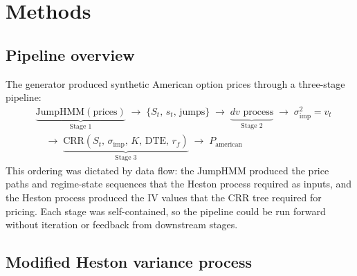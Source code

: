 \section{Methods}\label{sec:methods}

\subsection{Pipeline overview}

The generator produced synthetic American option prices through a three-stage pipeline:
\begin{align}\label{eq:pipeline}
    &\underbrace{\text{JumpHMM}(\text{prices})}_{\text{Stage 1}}
    \;\to\; \{S_t,\, s_t,\, \text{jumps}\}
    \;\to\; \underbrace{dv \text{ process}}_{\text{Stage 2}}
    \;\to\; \sigma_{\text{imp}}^2 = v_t \nonumber\\
    &\quad\to\; \underbrace{\text{CRR}(S_t,\, \sigma_{\text{imp}},\, K,\, \text{DTE},\, r_f)}_{\text{Stage 3}}
    \;\to\; P_{\text{american}}
\end{align}
This ordering was dictated by data flow: the JumpHMM produced the price paths and regime-state sequences that the Heston process required as inputs, and the Heston process produced the IV values that the CRR tree required for pricing. Each stage was self-contained, so the pipeline could be run forward without iteration or feedback from downstream stages.

\subsection{Modified Heston variance process}\label{sec:theta_function}

